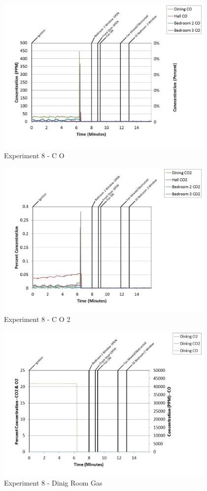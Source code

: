 \documentclass{article}
\begin{document}
\begin{appendices}
	\begin{figure}[h!]
		\centering
		\includegraphics[height=3.05in]{0_Images/Results_Charts/Exp_8_Charts/CO.pdf}
		\caption{Experiment 8 - C O}
	\end{figure}
 
	\clearpage

	\begin{figure}[h!]
		\centering
		\includegraphics[height=3.05in]{0_Images/Results_Charts/Exp_8_Charts/CO2.pdf}
		\caption{Experiment 8 - C O 2}
	\end{figure}
 

	\begin{figure}[h!]
		\centering
		\includegraphics[height=3.05in]{0_Images/Results_Charts/Exp_8_Charts/DinigRoomGas.pdf}
		\caption{Experiment 8 - Dinig Room Gas}
	\end{figure}
 

\end{appendices}
\end{document}
